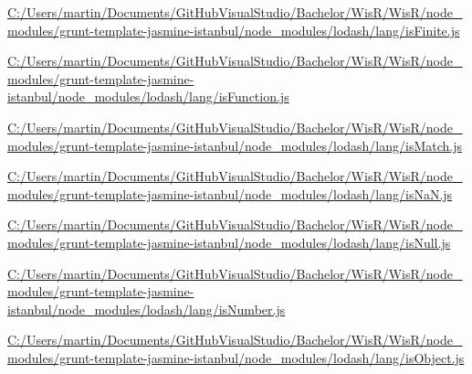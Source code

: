 \begin{DoxyCompactItemize}
\item 
\hyperlink{_c_1_2_users_2martin_2_documents_2_git_hub_visual_studio_2_bachelor_2_wis_r_2_wis_r_2node_moduleb30eb3fff90df20d2f51d1976c83a3fc}{C\+:/\+Users/martin/\+Documents/\+Git\+Hub\+Visual\+Studio/\+Bachelor/\+Wis\+R/\+Wis\+R/node\+\_\+modules/grunt-\/template-\/jasmine-\/istanbul/node\+\_\+modules/lodash/lang/is\+Finite.\+js}
\item 
\hyperlink{_c_1_2_users_2martin_2_documents_2_git_hub_visual_studio_2_bachelor_2_wis_r_2_wis_r_2node_module1d94bf6891744ab08dec8c0d5467a875}{C\+:/\+Users/martin/\+Documents/\+Git\+Hub\+Visual\+Studio/\+Bachelor/\+Wis\+R/\+Wis\+R/node\+\_\+modules/grunt-\/template-\/jasmine-\/istanbul/node\+\_\+modules/lodash/lang/is\+Function.\+js}
\item 
\hyperlink{_c_1_2_users_2martin_2_documents_2_git_hub_visual_studio_2_bachelor_2_wis_r_2_wis_r_2node_module0730f8db17ce5e6deda20881f6a9d0fc}{C\+:/\+Users/martin/\+Documents/\+Git\+Hub\+Visual\+Studio/\+Bachelor/\+Wis\+R/\+Wis\+R/node\+\_\+modules/grunt-\/template-\/jasmine-\/istanbul/node\+\_\+modules/lodash/lang/is\+Match.\+js}
\item 
\hyperlink{_c_1_2_users_2martin_2_documents_2_git_hub_visual_studio_2_bachelor_2_wis_r_2_wis_r_2node_modulec8ea313bd673a11b08a6e0dd9f6e966d}{C\+:/\+Users/martin/\+Documents/\+Git\+Hub\+Visual\+Studio/\+Bachelor/\+Wis\+R/\+Wis\+R/node\+\_\+modules/grunt-\/template-\/jasmine-\/istanbul/node\+\_\+modules/lodash/lang/is\+Na\+N.\+js}
\item 
\hyperlink{_c_1_2_users_2martin_2_documents_2_git_hub_visual_studio_2_bachelor_2_wis_r_2_wis_r_2node_module92fabaf35293e30fed7a4ffe0f98aa23}{C\+:/\+Users/martin/\+Documents/\+Git\+Hub\+Visual\+Studio/\+Bachelor/\+Wis\+R/\+Wis\+R/node\+\_\+modules/grunt-\/template-\/jasmine-\/istanbul/node\+\_\+modules/lodash/lang/is\+Null.\+js}
\item 
\hyperlink{_c_1_2_users_2martin_2_documents_2_git_hub_visual_studio_2_bachelor_2_wis_r_2_wis_r_2node_modulee6c61a97fe4d621c4d4300870b3f639c}{C\+:/\+Users/martin/\+Documents/\+Git\+Hub\+Visual\+Studio/\+Bachelor/\+Wis\+R/\+Wis\+R/node\+\_\+modules/grunt-\/template-\/jasmine-\/istanbul/node\+\_\+modules/lodash/lang/is\+Number.\+js}
\item 
\hyperlink{_c_1_2_users_2martin_2_documents_2_git_hub_visual_studio_2_bachelor_2_wis_r_2_wis_r_2node_modulef50e8c9dbbbf134d953acdb389d5154a}{C\+:/\+Users/martin/\+Documents/\+Git\+Hub\+Visual\+Studio/\+Bachelor/\+Wis\+R/\+Wis\+R/node\+\_\+modules/grunt-\/template-\/jasmine-\/istanbul/node\+\_\+modules/lodash/lang/is\+Object.\+js}

\end{DoxyCompactItemize}
